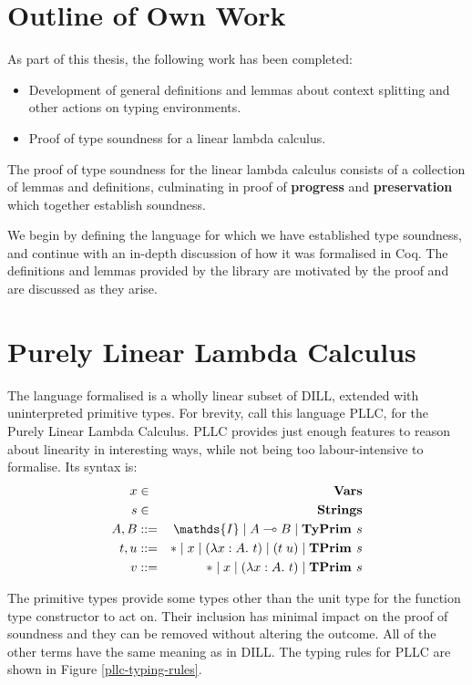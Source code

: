 \documentclass[]{unswthesis}
\newcommand{\lam}[1]{\lambda #1 \ldotp \,}
\newcommand{\app}[2]{(#1 \; #2)}
\newcommand{\lolly}{\multimap}
\newcommand{\sor}{\; | \;}
\newcommand{\TyPrim}[1]{\b{TyPrim } #1}
\newcommand{\TPrim}[1]{\b{TPrim } #1}
\let\b\textbf
\begin{document}

\section{Outline of Own Work}

As part of this thesis, the following work has been completed:

\begin{itemize}
\item Development of general definitions and lemmas about context splitting and other actions on typing environments.
\item Proof of type soundness for a linear lambda calculus.
\end{itemize}

The proof of type soundness for the linear lambda calculus consists of a collection of lemmas and definitions, culminating in proof of \b{progress} and \b{preservation} which together establish soundness.

We begin by defining the language for which we have established type soundness, and continue with an in-depth discussion of how it was formalised in Coq. The definitions and lemmas provided by the library are motivated by the proof and are discussed as they arise.

\section{Purely Linear Lambda Calculus}

The language formalised is a wholly linear subset of DILL, extended with uninterpreted primitive types. For brevity, call this language PLLC, for the Purely Linear Lambda Calculus. PLLC provides just enough features to reason about linearity in interesting ways, while not being too labour-intensive to formalise. Its syntax is:
\begin{eqnarray*}
x & \in & \b{Vars} \\
s & \in & \b{Strings} \\
A,B & ::= & \mathds{I} \sor A \lolly B \sor \TyPrim{s} \\
t,u & ::= & * \sor x \sor (\lam{x : A} t) \sor \app{t}{u} \sor \TPrim{s} \\
v & ::= & * \sor x \sor (\lam{x : A} t) \sor \TPrim{s}
\end{eqnarray*}

The primitive types provide some types other than the unit type for the function type constructor to act on. Their inclusion has minimal impact on the proof of soundness and they can be removed without altering the outcome. All of the other terms have the same meaning as in DILL. The typing rules for PLLC are shown in Figure \ref{pllc-typing-rules}.
\end{document}
